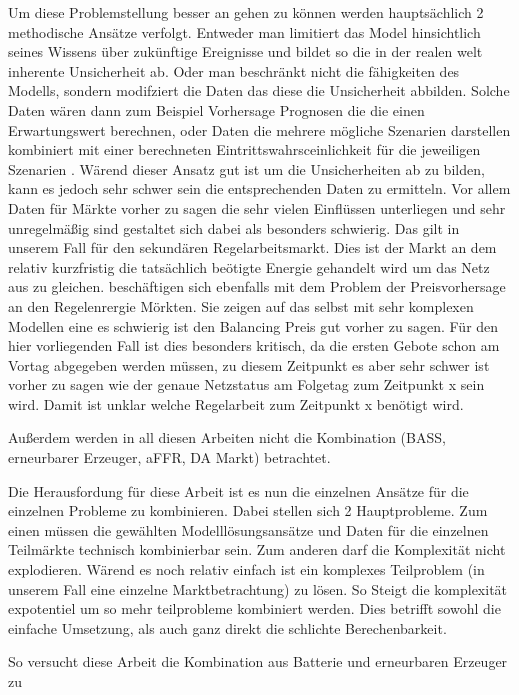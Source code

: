 Um diese Problemstellung besser an gehen zu können werden hauptsächlich 2 methodische Ansätze verfolgt. Entweder man limitiert das Model hinsichtlich
seines Wissens über zukünftige Ereignisse und bildet so die in der realen welt inherente Unsicherheit ab. Oder man beschränkt nicht die fähigkeiten des
Modells, sondern modifziert die Daten das diese die Unsicherheit abbilden. Solche Daten wären dann zum Beispiel Vorhersage Prognosen die
die einen Erwartungswert berechnen, oder Daten die mehrere mögliche Szenarien darstellen kombiniert mit einer berechneten Eintrittswahrsceinlichkeit für
die jeweiligen Szenarien \cite{Krishnamurthy.2018}. Wärend dieser Ansatz gut ist um die Unsicherheiten ab zu bilden, kann es jedoch sehr schwer sein
die entsprechenden Daten zu ermitteln. Vor allem Daten für Märkte vorher zu sagen die sehr vielen Einflüssen unterliegen und sehr unregelmäßig sind
gestaltet sich dabei als besonders schwierig. Das gilt in unserem Fall für den sekundären Regelarbeitsmarkt. Dies ist der Markt
an dem relativ kurzfristig die tatsächlich beötigte Energie gehandelt wird um das Netz aus zu gleichen. \cite{OConnor.2024} beschäftigen sich ebenfalls mit
dem Problem der Preisvorhersage an den Regelenrergie Mörkten. Sie zeigen auf das selbst mit sehr komplexen Modellen eine es schwierig ist den Balancing Preis gut vorher zu sagen.
Für den hier vorliegenden Fall ist dies besonders kritisch, da die ersten Gebote schon am Vortag abgegeben werden müssen, zu diesem Zeitpunkt es aber sehr schwer ist vorher zu sagen
wie der genaue Netzstatus am Folgetag zum Zeitpunkt x
sein wird. Damit ist unklar welche Regelarbeit zum Zeitpunkt x benötigt wird.


Außerdem werden in all diesen Arbeiten nicht die Kombination (BASS, erneurbarer Erzeuger, aFFR, DA Markt) betrachtet.

Die Herausfordung für diese Arbeit ist es nun die einzelnen Ansätze für die einzelnen Probleme zu kombinieren.
Dabei stellen sich 2 Hauptprobleme. Zum einen müssen die gewählten Modelllösungsansätze und Daten für die einzelnen Teilmärkte technisch kombinierbar sein.
Zum anderen darf die Komplexität nicht explodieren. Wärend es noch relativ einfach ist ein komplexes Teilproblem (in unserem Fall
eine einzelne Marktbetrachtung) zu lösen. So Steigt die komplexität expotentiel um so mehr teilprobleme kombiniert werden.
Dies betrifft sowohl die einfache Umsetzung, als auch ganz direkt die schlichte Berechenbarkeit.

So versucht diese Arbeit die Kombination aus Batterie und erneurbaren Erzeuger zu

